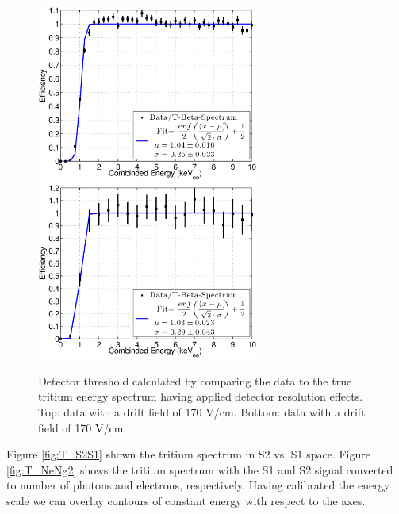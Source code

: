 \begin{figure}[h!]\centering
\includegraphics[width=73mm]{Chapter_E_Scale/Figures/E_Spec/E_Thres_LY_QY_iter1.eps}
\includegraphics[width=73mm]{Chapter_E_Scale/Figures/Spec_Thresh_100/E_Thres_.eps}
\caption{Detector threshold calculated by comparing the data to the true tritium energy spectrum having applied detector resolution effects. Top: data with a drift field of 170 V/cm. Bottom: data with a drift field of 170 V/cm.}
\label{fig:Thres}
\end{figure}


\newpage
Figure \ref{fig:T_S2S1} shown the tritium spectrum in S2 vs. S1 space. Figure \ref{fig:T_NeNg2} shows the tritium spectrum with the S1 and S2 signal converted to number of photons and electrons, respectively. Having calibrated the energy scale we can overlay contours of constant energy with respect to the axes.

